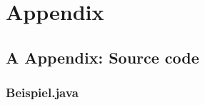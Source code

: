 {}
\chapter*{Appendix}


{}
\section*{A Appendix: Source code}

\subsection*{Beispiel.java}\label{stegotext}

\newpage
